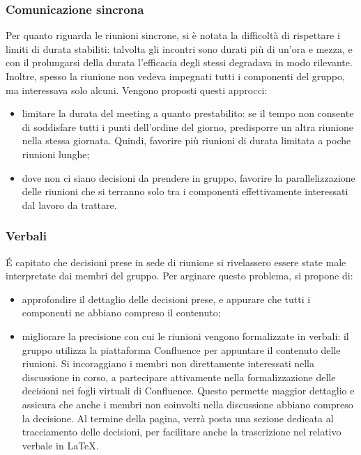 \subsubsection{Comunicazione sincrona}

Per quanto riguarda le riunioni sincrone, si è notata la difficoltà di rispettare i limiti di durata stabiliti: talvolta gli incontri sono durati più di un'ora e mezza, e con il prolungarsi della durata l'efficacia degli stessi degradava in modo rilevante. Inoltre, spesso la riunione non vedeva impegnati tutti i componenti del gruppo, ma interessava solo alcuni. Vengono proposti questi approcci:
\begin{itemize}
	\item limitare la durata del meeting a quanto prestabilito: se il tempo non consente di soddisfare tutti i punti dell'ordine del giorno, predisporre un altra riunione nella stessa giornata. Quindi, favorire più riunioni di durata limitata a poche riunioni lunghe;
	\item dove non ci siano decisioni da prendere in gruppo, favorire la parallelizzazione delle riunioni che si terranno solo tra i componenti effettivamente interessati dal lavoro da trattare.
\end{itemize}



\subsubsection{Verbali}

\'E capitato che decisioni prese in sede di riunione si rivelassero essere state male interpretate dai membri del gruppo. Per arginare questo problema, si propone di:
\begin{itemize}
	\item approfondire il dettaglio delle decisioni prese, e appurare che tutti i componenti ne abbiano compreso il contenuto;
	\item migliorare la precisione con cui le riunioni vengono formalizzate in verbali: il gruppo utilizza la piattaforma Confluence per appuntare il contenuto delle riunioni. Si incoraggiano i membri non direttamente interessati nella discussione in corso, a partecipare attivamente nella formalizzazione delle decisioni nei fogli virtuali di Confluence. Questo permette maggior dettaglio e assicura che anche i membri non coinvolti nella discussione abbiano compreso la decisione. Al termine della pagina, verrà posta una sezione dedicata al tracciamento delle decisioni, per facilitare anche la trascrizione nel relativo verbale in \LaTeX{}.
\end{itemize}

